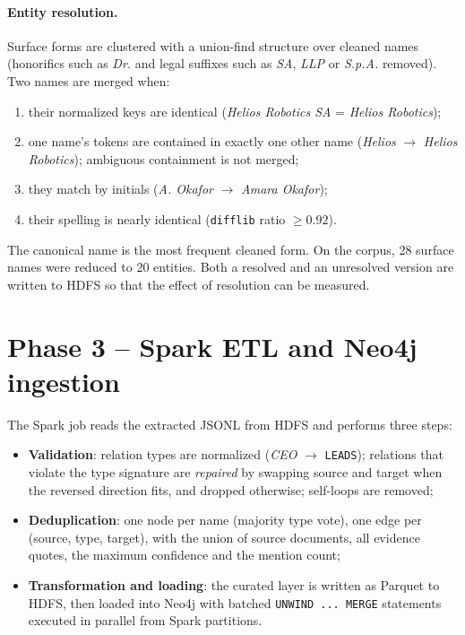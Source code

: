 \documentclass[11pt,a4paper]{report}
\begin{document}
\paragraph{Entity resolution.} Surface forms are clustered with a union-find structure over cleaned names
(honorifics such as \emph{Dr.} and legal suffixes such as \emph{SA}, \emph{LLP} or \emph{S.p.A.} removed). Two names
are merged when:
\begin{enumerate}
  \item their normalized keys are identical (\emph{Helios Robotics SA} = \emph{Helios Robotics});
  \item one name's tokens are contained in exactly one other name (\emph{Helios} $\to$ \emph{Helios Robotics});
        ambiguous containment is not merged;
  \item they match by initials (\emph{A. Okafor} $\to$ \emph{Amara Okafor});
  \item their spelling is nearly identical (\texttt{difflib} ratio $\geq 0.92$).
\end{enumerate}
The canonical name is the most frequent cleaned form. On the corpus, 28 surface names were reduced to 20 entities.
Both a resolved and an unresolved version are written to HDFS so that the effect of resolution can be measured.

\section{Phase 3 -- Spark ETL and Neo4j ingestion}
The Spark job reads the extracted JSONL from HDFS and performs three steps:
\begin{itemize}
  \item \textbf{Validation}: relation types are normalized (\emph{CEO} $\to$ \texttt{LEADS}); relations that violate
        the type signature are \emph{repaired} by swapping source and target when the reversed direction fits,
        and dropped otherwise; self-loops are removed;
  \item \textbf{Deduplication}: one node per name (majority type vote), one edge per (source, type, target), with the
        union of source documents, all evidence quotes, the maximum confidence and the mention count;
  \item \textbf{Transformation and loading}: the curated layer is written as Parquet to HDFS, then loaded into Neo4j
        with batched \texttt{UNWIND ... MERGE} statements executed in parallel from Spark partitions.
\end{itemize}
\end{document}
